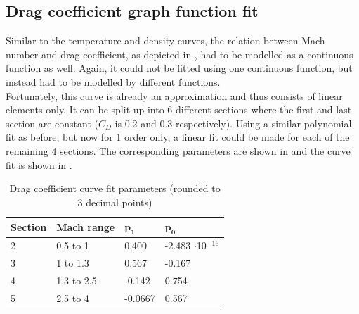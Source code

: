 
\subsection{Drag coefficient graph function fit}
\label{subsec:dragCoefFuncFit}
Similar to the temperature and density curves, the relation between Mach number and drag coefficient, as depicted in , had to be modelled as a continuous function as well. Again, it could not be fitted using one continuous function, but instead had to be modelled by different functions. \\


Fortunately, this curve is already an approximation and thus consists of linear elements only. It can be split up into 6 different sections where the first and last section are constant ($C_{D}$ is 0.2 and 0.3 respectively). Using a similar polynomial fit as before, but now for 1 order only, a linear fit could be made for each of the remaining 4 sections. The corresponding parameters are shown in  and the curve fit is shown in .


\begin{table}[!ht]
\begin{center}
\caption{Drag coefficient curve fit parameters (rounded to 3 decimal points)}
\label{tab:dragCoeffPara}
\begin{tabular}{|l|l||l|l|}
\hline 
\textbf{Section}  & \textbf{Mach range}& $\mathbf{p_{1}}$ & $\mathbf{p_{0}}$ \\ \hline 
2  & 0.5 to 1  & 0.400 & -2.483 $\cdot$10$^{-16}$  \\ \hline
3  & 1 to 1.3  & 0.567 & -0.167  \\ \hline
4  &  1.3 to 2.5 & -0.142 & 0.754 \\ \hline
5  &  2.5 to 4 & -0.0667 & 0.567 \\ \hline
\end{tabular}
\end{center}
\end{table}



